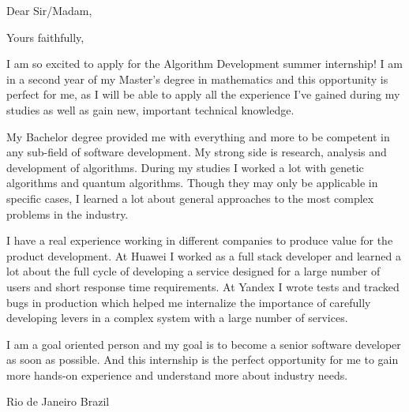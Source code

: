 \documentclass[12pt,a4paper,sans]{moderncv}        %
\begin{document}
	\clearpage
	\date{\today}
	\opening{Dear Sir/Madam,}
	\closing{Yours faithfully,}
	\makelettertitle
	I am so excited to apply for the Algorithm Development summer internship! I am in a second year of my Master's degree in mathematics and this opportunity is perfect for me, as I will be able to apply all the experience I've gained during my studies as well as gain new, important technical knowledge.
	
	My Bachelor degree provided me with everything and more to be competent in any sub-field of software development. My strong side is research, analysis and development of algorithms. During my studies I worked a lot with genetic algorithms and quantum algorithms. Though they may only be applicable in specific cases, I learned a lot about general approaches to the most complex problems in the industry.
	
	I have a real experience working in different companies to produce value for the product development. At Huawei I worked as a full stack developer and learned a lot about the full cycle of developing a service designed for a large number of users and short response time requirements. At Yandex I wrote tests and tracked bugs in production which helped me internalize the importance of carefully developing levers in a complex system with a large number of services.
	
	I am a goal oriented person and my goal is to become a senior software developer as soon as possible. And this internship is the perfect opportunity for me to gain more hands-on experience and understand more about industry needs.
	

	
	\title{}
	\address{Rua Barata Ribeiro 194}{Rio de Janeiro}{ Brazil }
	\makeletterclosing
	\name{}{}
\end{document}
